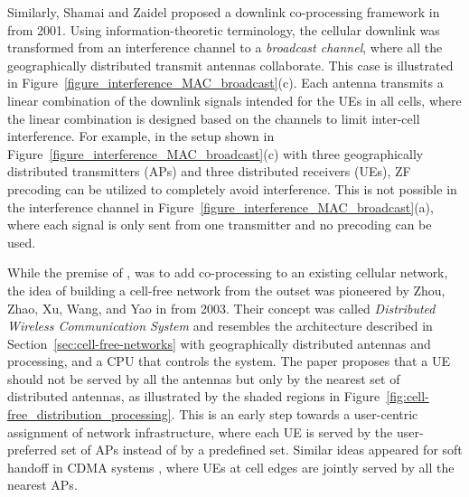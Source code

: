 Similarly, Shamai and Zaidel proposed a downlink co-processing framework in \cite{Shamai2001a} from 2001. Using information-theoretic terminology, the cellular downlink was transformed from an interference channel to a \emph{broadcast channel}, where all the geographically distributed transmit antennas collaborate. This case is illustrated in Figure~\ref{figure_interference_MAC_broadcast}(c). Each antenna  transmits a linear combination of the downlink signals intended for the UEs in all cells, where the linear combination is designed based on the channels to limit inter-cell interference. 
For example, in the setup shown in Figure~\ref{figure_interference_MAC_broadcast}(c) with three geographically distributed transmitters (\glspl{AP}) and three distributed receivers (\glspl{UE}), \gls{ZF} precoding can be utilized to completely avoid interference. This is not possible in the interference channel in Figure~\ref{figure_interference_MAC_broadcast}(a), where each signal is only sent from one transmitter and no precoding can be used.

\enlargethispage{\baselineskip} 

While the premise of  \cite{Shamai2001a}, \cite{Wyner1994a} was to add co-processing to an existing cellular network, the idea of building a cell-free network from the outset was pioneered by Zhou, Zhao, Xu, Wang, and Yao in \cite{Zhou2003a} from 2003. Their concept was called \emph{Distributed Wireless Communication System} and resembles the architecture described in Section~\ref{sec:cell-free-networks} with geographically distributed antennas and processing, and a \gls{CPU} that controls the system. The paper proposes that a \gls{UE} should not be served by all the antennas but only by the nearest set of distributed antennas, as illustrated by the shaded regions in Figure~\ref{fig:cell-free_distribution_processing}. This is an early step towards a user-centric assignment of network infrastructure, where each \gls{UE} is served by the user-preferred set of \glspl{AP} instead of by a predefined set. Similar ideas appeared for soft handoff in \gls{CDMA} systems \cite{Viterbi1994a}, where UEs at cell edges are jointly served by all the nearest \glspl{AP}.

